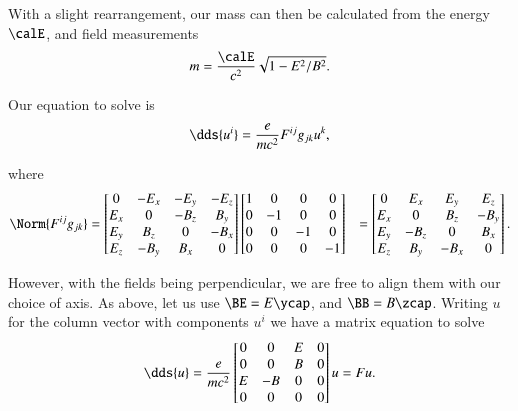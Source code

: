 {With a slight rearrangement, our mass can then be calculated from the energy \(\calE\), and field measurements
%
\begin{equation}\label{eqn:relElectroDynProblemSet2:470}
m = \frac{ \calE }{c^2} \sqrt{ 1 - E^2/B^2 }.
\end{equation}



Our equation to solve is
%
\begin{equation}\label{eqn:relElectroDynProblemSet2:490}
\dds{u^i} = \frac{e}{m c^2} F^{ij} g_{jk} u^k,
\end{equation}

where
%
\begin{equation}\label{eqn:relElectroDynProblemSet2:510}
\begin{aligned}
\Norm{ F^{ij} g_{jk} }
&=
\begin{bmatrix}
0 & -E_x & -E_y & -E_z \\
E_x & 0 & -B_z & B_y \\
E_y & B_z & 0 & -B_x \\
E_z & -B_y & B_x & 0
\end{bmatrix}
\begin{bmatrix}
1 & 0 & 0 & 0 \\
0 & -1 & 0 & 0 \\
0 & 0 & -1 & 0 \\
0 & 0 & 0 & -1 \\
\end{bmatrix}
&=
\begin{bmatrix}
0 & E_x & E_y & E_z \\
E_x & 0 & B_z & -B_y \\
E_y & -B_z & 0 & B_x \\
E_z & B_y & -B_x & 0
\end{bmatrix}.
\end{aligned}
\end{equation}

However, with the fields being perpendicular, we are free to align them with our choice of axis.  As above, let us use \(\BE = E \ycap\), and \(\BB = B \zcap\).  Writing \(u\) for the column vector with components \(u^i\) we have a matrix equation to solve
%
\begin{equation}\label{eqn:relElectroDynProblemSet2:530}
\dds{u} =
\frac{ e }{m c^2}
\begin{bmatrix}
0 & 0 & E & 0 \\
0 & 0 & B & 0 \\
E & -B & 0 & 0 \\
0 & 0 & 0 & 0
\end{bmatrix} u = F u.
\end{equation}

}
